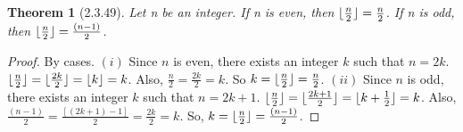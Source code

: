 \documentclass[a4paper, 12pt]{article}
\theoremstyle{plain}
\newtheorem*{theorem*}{Theorem}
\DeclarePairedDelimiter{\floor}{\lfloor}{\rfloor}
\begin{document}
	
	\begin{theorem*}[2.3.49]
		Let n be an integer. If n is even, then $\floor{\frac{n}{2}} = \frac{n}{2}$. \newline If n is odd, then $\floor{\frac{n}{2}} = \frac{(n - 1)}{2}$.
	\end{theorem*}
	
	\begin{proof}
		By cases. \newline \newline $(i)$ Since $n$ is even,  there exists an integer $k$ such that $n = 2k$. \newline $\floor{\frac{n}{2}} = \floor{\frac{2k}{2}} = \floor{k} = k$. Also, $\frac{n}{2} = \frac{2k}{2} = k$. So $k = \floor{\frac{n}{2}} = \frac{n}{2}$.
		\newline
		\newline
		$(ii)$ Since $n$ is odd, there exists an integer $k$ such that $n = 2k + 1$. \newline $\floor{\frac{n}{2}} = \floor{\frac{2k + 1}{2}} = \floor{k + \frac{1}{2}} = k$. Also, $\frac{(n-1)}{2} = \frac{[(2k + 1) - 1]}{2} = \frac{2k}{2} = k$. \newline So, $k = \floor{\frac{n}{2}} = \frac{(n - 1)}{2}$.
	\end{proof}
\end{document}
